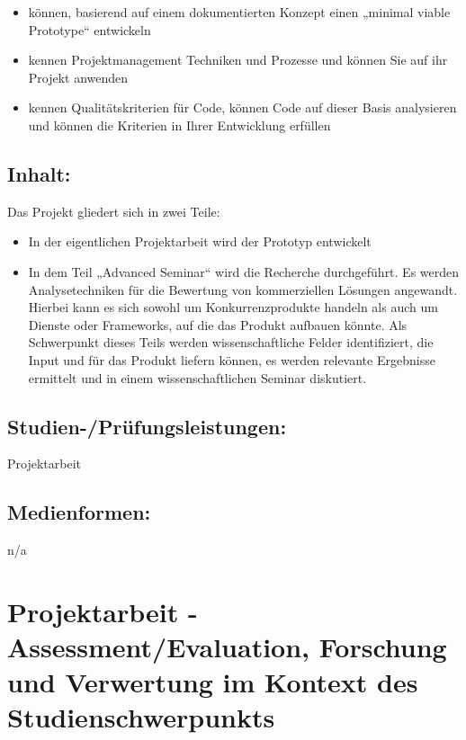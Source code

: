 \begin{itemize}
\item
  können, basierend auf einem dokumentierten Konzept einen „minimal
  viable Prototype`` entwickeln
\item
  kennen Projektmanagement Techniken und Prozesse und können Sie auf ihr
  Projekt anwenden
\item
  kennen Qualitätskriterien für Code, können Code auf dieser Basis
  analysieren und können die Kriterien in Ihrer Entwicklung erfüllen
\end{itemize}

\section*{Inhalt:}\label{inhalt-14}

Das Projekt gliedert sich in zwei Teile:

\begin{itemize}
\item
  In der eigentlichen Projektarbeit wird der Prototyp entwickelt
\item
  In dem Teil „Advanced Seminar`` wird die Recherche durchgeführt. Es
  werden Analysetechniken für die Bewertung von kommerziellen Lösungen
  angewandt. Hierbei kann es sich sowohl um Konkurrenzprodukte handeln
  als auch um Dienste oder Frameworks, auf die das Produkt aufbauen
  könnte. Als Schwerpunkt dieses Teils werden wissenschaftliche Felder
  identifiziert, die Input und für das Produkt liefern können, es werden
  relevante Ergebnisse ermittelt und in einem wissenschaftlichen Seminar
  diskutiert.
\end{itemize}

\section*{Studien-/Prüfungsleistungen:}\label{studien-pruxfcfungsleistungen-14}

Projektarbeit

\section*{Medienformen:}\label{medienformen-14}

n/a

\chapter{Projektarbeit - Assessment/Evaluation, Forschung und Verwertung
im Kontext des
Studienschwerpunkts}\label{projektarbeit---assessmentevaluation-forschung-und-verwertung-im-kontext-des-studienschwerpunkts}


